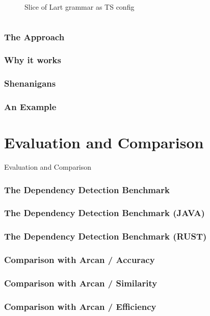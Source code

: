\documentclass[dvipsnames, 10pt]{beamer}
\begin{document}
\begin{frame}
\begin{columns}
\begin{column}{0.5\textwidth}
\begin{figure}
\begin{center}
          \caption{Slice of Lart grammar as TS config}
        \end{center}
      \end{figure}
    \end{column}
  \end{columns}
\end{frame}

\begin{frame}
  \frametitle{The Approach}
\end{frame}

\begin{frame}
  \frametitle{Why it works}
\end{frame}

\begin{frame}
  \frametitle{Shenanigans}
\end{frame}

\begin{frame}
  \frametitle{An Example}
\end{frame}

\section{Evaluation and Comparison}
\begin{frame}
  \centering
  \Huge
  Evaluation and Comparison
\end{frame}

\begin{frame}
  \frametitle{The Dependency Detection Benchmark}
\end{frame}

\begin{frame}
  \frametitle{The Dependency Detection Benchmark (JAVA)}
\end{frame}

\begin{frame}
  \frametitle{The Dependency Detection Benchmark (RUST)}
\end{frame}

\begin{frame}
  \frametitle{Comparison with Arcan / Accuracy}
\end{frame}

\begin{frame}
  \frametitle{Comparison with Arcan / Similarity}
\end{frame}

\begin{frame}
  \frametitle{Comparison with Arcan / Efficiency}
\end{frame}
\end{document}
